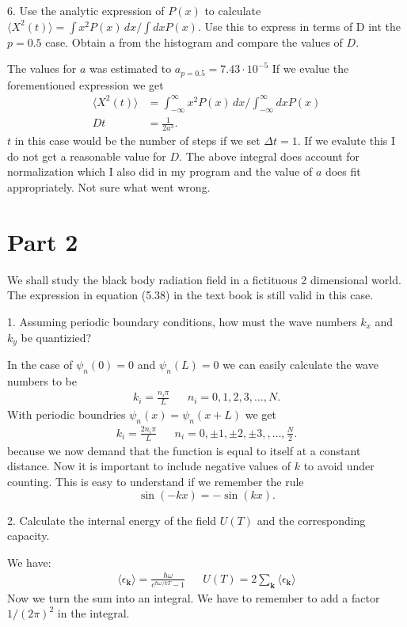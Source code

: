 \documentclass[twocolumn]{article}[10pt]
\begin{document}
{\color{black!70} 
6. Use the analytic expression of $P(x)$ to calculate 
$\langle X^2(t)\rangle = \int x^2 P(x)\,dx /\int dx P(x)$. 
Use this to express in terms of D int the $p=0.5$ case. Obtain a 
from the histogram and compare the values of $D$.
}

The values for $a$ was estimated to $a_{p=0.5}=7.43\cdot 10^{-5}$
If we evalue the forementioned expression we get 
\begin{align*}
\langle X^2(t)\rangle 
&= 
\int_{-\infty}^\infty x^2 P(x)\,dx /\int_{-\infty}^\infty dx P(x)\\
Dt&=\frac{1}{2a^3}.
\end{align*}
$t$ in this case would be the number of steps if we set $\Delta t = 1$. 
If we evalute this I do not get a reasonable value for $D$. The above
integral does account for normalization which I also did in my program
and the value of $a$ does fit appropriately. Not sure what went wrong. 

{\center \section*{Part 2}}
{\color{black!70} 
We shall study the black body radiation field in a fictituous 2 
dimensional world. The expression in equation (5.38) in the text 
book is still valid in this case. 

1. Assuming periodic boundary conditions, how must the wave numbers
$k_x$ and $k_y$ be quantizied?
}

In the case of $\psi_n(0) = 0$ and 
$\psi_n(L) = 0$ we can easily calculate the wave numbers to be
\begin{align*}
k_i = \frac{n_i\pi}{L}&& n_i=0,1,2,3,\dots,N.
\end{align*}
With periodic boundries $\psi_n(x) = \psi_n(x + L)$ we get
\begin{align*}
k_i = \frac{2n_i\pi}{L}&& n_i= 0, \pm1,\pm2,\pm3,,\dots,\frac{N}{2}.
\end{align*}
because we now demand that the function is equal to itself at
a constant distance. Now it is important to include negative values
of $k$ to avoid under counting. This is easy to understand if we 
remember the rule $$\sin(-kx) = -\sin(kx).$$

{\color{black!70} 
2. Calculate the internal energy of the field $U(T)$ and the corresponding
capacity. 
}

We have:
\begin{align*}
\langle \epsilon_{\mathbf k}\rangle = \frac{\hbar\omega}{e^{\hbar\omega/kT}-1}
&&
U(T) = 2\sum_{\mathbf k} \langle \epsilon_{\mathbf k}\rangle 
\end{align*}
Now we turn the sum into an integral. 
We have to remember to add a factor $1/(2\pi)^2$ in the integral. 
\end{document}
